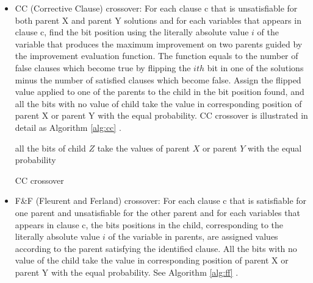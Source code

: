 \begin{itemize}
	\item
	      CC (Corrective Clause) crossover: For each clause c that is unsatisfiable for
	      both parent X and parent Y solutions and for each variables that appears in
	      clause c, find the bit position using the literally absolute value
	      $i$ of the variable that produces the maximum improvement
	      on two parents guided by the improvement evaluation function. The function
	      equals to the number of false clauses which become true by flipping the
	      $ith$ bit in one of the solutions minus the number of
	      satisfied clauses which become false. Assign the flipped value applied to one
	      of the parents to the child in the bit position found, and all the bits with
	      no value of child take the value in corresponding position of parent X or
	      parent Y with the equal probability. CC crossover is illustrated in detail as
	      Algorithm \ref{alg:cc} \parencite{lardeux2006gasat}.

	      \begin{algorithm}
		      \SetAlgoLined
		      \BlankLine
		      all the bits of child $Z$ take the values of parent
		      $X$ or parent $Y$ with the equal
		      probability\;  \caption{CC crossover}
		      \label{alg:cc}
	      \end{algorithm}

	\item
	      F\&F (Fleurent and Ferland) crossover: For each clause c that is satisfiable
	      for one parent and unsatisfiable for the other parent and for each variables
	      that appears in clause c, the bits positions in the child, corresponding to
	      the literally absolute value $i$ of the variable in
	      parents, are assigned values according to the parent satisfying the identified
	      clause. All the bits with no value of the child take the value in
	      corresponding position of parent X or parent Y with the equal probability. See
	      Algorithm \ref{alg:ff} \parencite{lardeux2006gasat}.


\end{itemize}
